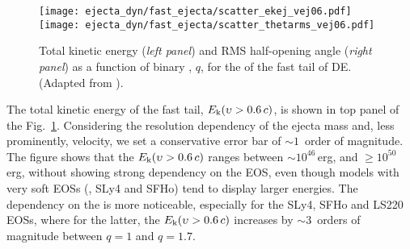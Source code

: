 \begin{figure}%
    \centering 
    \texttt{[image: ejecta\_dyn/fast\_ejecta/scatter\_ekej\_vej06.pdf]}
    \texttt{[image: ejecta\_dyn/fast\_ejecta/scatter\_thetarms\_vej06.pdf]}
    \caption{
        Total kinetic energy (\textit{left panel}) and \ac{RMS} half-opening angle 
        (\textit{right panel}) as a function of binary \mr{}, $q$, for the 
        of the fast tail of \ac{DE}. 
        (Adapted from \citet{Nedora:2021eoj}). 
    } 
    \label{fig:ejecta_v06}
\end{figure}


The total kinetic energy of the fast tail, $E_{\rm k}(\upsilon > 0.6\, c)$,
is shown in top panel of the Fig.~\ref{fig:ejecta_v06}.
Considering the resolution dependency of the ejecta mass and, less prominently, velocity, 
we set a conservative error bar of ${\sim}1$~order of magnitude.
%
The figure shows that the $E_{\rm k}(\upsilon > 0.6\, c)$ ranges between 
${\sim}10^{46}\,$erg, and ${\geq}10^{50}\,$erg, without showing 
strong dependency on the \ac{EOS}, even though models with very soft \acp{EOS} 
(\eg, SLy4 and SFHo) tend to display larger energies. 
%
The dependency on the \mr{} is more noticeable, especially for the 
SLy4, SFHo and LS220 \acp{EOS}, where for the latter, the 
$E_{\rm k}(\upsilon > 0.6\, c)$ 
increases by ${\sim3}\,$ orders of magnitude between $q=1$ and $q=1.7$. 

